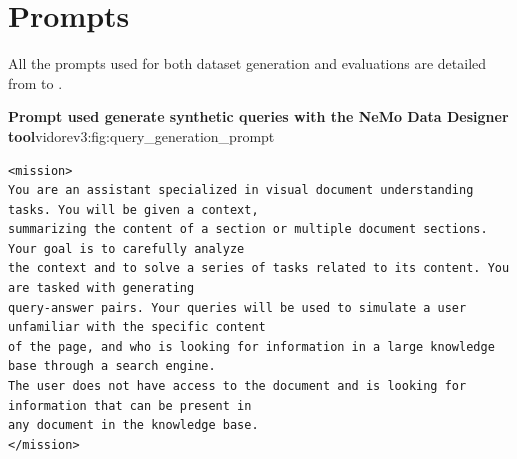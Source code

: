 \section{Prompts}

All the prompts used for both dataset generation and evaluations are detailed from  to .

\begin{promptfigure}{\textbf{Prompt used generate synthetic queries with the NeMo Data Designer tool}}{vidorev3:fig:query_generation_prompt}
\begin{Verbatim}[breaklines=true,breakanywhere=true,fontsize=\tiny]
<mission>
You are an assistant specialized in visual document understanding tasks. You will be given a context, 
summarizing the content of a section or multiple document sections. Your goal is to carefully analyze 
the context and to solve a series of tasks related to its content. You are tasked with generating 
query-answer pairs. Your queries will be used to simulate a user unfamiliar with the specific content 
of the page, and who is looking for information in a large knowledge base through a search engine. 
The user does not have access to the document and is looking for information that can be present in 
any document in the knowledge base.
</mission>


\end{Verbatim}
\end{promptfigure}
